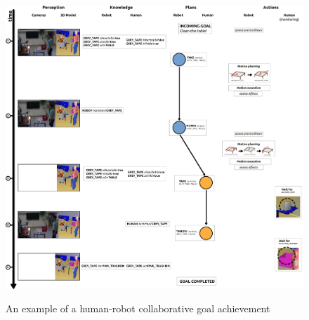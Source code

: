 \documentclass[preprint,12pt]{elsarticle}
\begin{document}
\begin{figure}[thpb]
  \centering
    \includegraphics[width=1.0\textwidth]{./figs/manip_run.pdf} \\
    \begin{center}
    \caption {An example of a human-robot collaborative goal achievement}
    \end{center}
  \label{manip_run_fg}
\end{figure}


\end{document}
